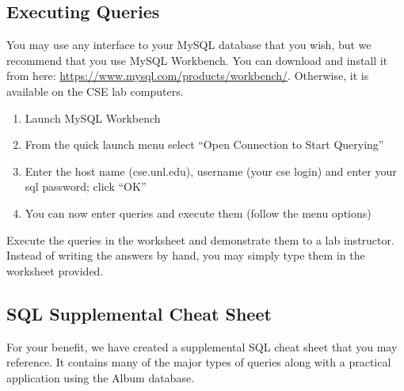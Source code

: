 \documentclass[12pt]{scrartcl}
\begin{document}
\subsection*{Executing Queries}

You may use any interface to your MySQL database that you wish, but 
we recommend that you use MySQL Workbench.  You can download and
install it from here: \url{https://www.mysql.com/products/workbench/}.
Otherwise, it is available on the CSE lab computers.

\begin{enumerate}
  \item Launch MySQL Workbench
  \item From the quick launch menu select ``Open Connection to Start Querying''
  \item Enter the host name (cse.unl.edu), username (your cse login) 
    and enter your sql password; click ``OK''
  \item You can now enter queries and execute them (follow the menu options)
\end{enumerate}

Execute the queries in the worksheet and demonstrate them to a
lab instructor.  Instead of writing the answers by hand, you may
simply type them in the worksheet provided.
  
\subsection*{SQL Supplemental Cheat Sheet}

For your benefit, we have created a supplemental SQL cheat sheet that 
you may reference.  It contains many of the major types of queries 
along with a practical application using the Album database.
\end{document}
